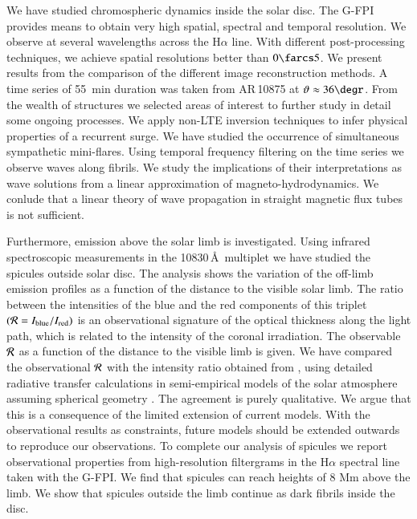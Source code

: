 \documentclass[goettingen,print,hyper]{thesis}
\begin{document}
We have studied chromospheric dynamics inside the solar disc. The G-FPI provides means to obtain very high spatial, spectral and temporal resolution. We observe at several wavelengths across the H$\alpha$ line. With different post-processing techniques, we achieve spatial resolutions better than $0\farcs5$. We present results from the comparison of the different image reconstruction methods.  A time series of 55~min duration was taken from AR\,10875 at $\vartheta\approx36\degr$. From the wealth of structures we selected areas of interest to further study in detail some ongoing processes. We apply non-LTE inversion techniques to infer physical properties of a recurrent surge. We have studied the occurrence of simultaneous sympathetic mini-flares. Using temporal frequency filtering on the time series we observe waves along fibrils. We study the implications of their interpretations as wave solutions from a linear approximation of magneto-hydrodynamics. We conlude that a linear theory of wave propagation in straight magnetic flux tubes is not sufficient. 

Furthermore, emission above the solar limb is investigated. Using infrared spectroscopic measurements in the  10830\,\AA\ multiplet
 we have studied the spicules outside solar disc. The analysis shows the variation of the  off-limb emission profiles as a function of the distance to the visible solar limb. The 
ratio between the intensities of the blue and the red components of this triplet $({\cal R}=I_{\rm blue}/I_{\rm red})$ is an observational signature of the optical thickness along the light path, which is related to the intensity of the coronal irradiation. The observable ${\cal R}$ as a function of the distance to the visible limb is given. We have compared the observational ${\cal R}$ with the intensity ratio obtained from \citet{Centeno06}, using detailed radiative transfer calculations in semi-empirical models of the solar atmosphere assuming spherical geometry
. The agreement is purely qualitative. We argue that this is a consequence of the limited extension of current models. With the observational results as constraints, future models should be extended outwards to reproduce our observations. To complete our analysis of spicules we report observational properties from high-resolution filtergrams in the H$\alpha$ spectral line taken with the G-FPI. We find that spicules can reach heights of 8 Mm above the limb. We show that spicules outside the limb continue as dark fibrils inside the disc.
\nopagebreak 
\end{document}
